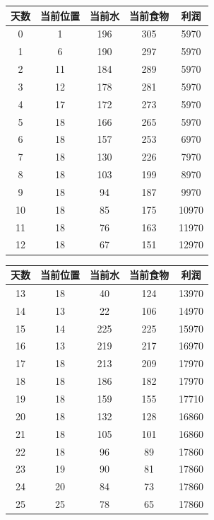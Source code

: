 \begin{figure}[h]
\centering
\begin{subfigure}[t]{0.48\textwidth}
\centering
\renewcommand{\arraystretch}{1.2}
\begin{tabular}{|c|c|c|c|c|}
\hline
天数 & 当前位置 & 当前水 & 当前食物 & 利润 \\
\hline
0 & 1 & 196 & 305 & 5970 \\
1 & 6 & 190 & 297 & 5970 \\
2 & 11 & 184 & 289 & 5970 \\
3 & 12 & 178 & 281 & 5970 \\
4 & 17 & 172 & 273 & 5970 \\
5 & 18 & 166 & 265 & 5970 \\
6 & 18 & 157 & 253 & 6970 \\
7 & 18 & 130 & 226 & 7970 \\
8 & 18 & 103 & 199 & 8970 \\
9 & 18 & 94 & 187 & 9970 \\
10 & 18 & 85 & 175 & 10970 \\
11 & 18 & 76 & 163 & 11970 \\
12 & 18 & 67 & 151 & 12970 \\
\hline
\end{tabular}
\end{subfigure}
\hfill
\begin{subfigure}[t]{0.48\textwidth}
\centering
\renewcommand{\arraystretch}{1.2}
\begin{tabular}{|c|c|c|c|c|}
\hline
天数 & 当前位置 & 当前水 & 当前食物 & 利润 \\
\hline
13 & 18 & 40 & 124 & 13970 \\
14 & 13 & 22 & 106 & 14970 \\
15 & 14 & 225 & 225 & 15970 \\
16 & 13 & 219 & 217 & 16970 \\
17 & 18 & 213 & 209 & 17970 \\
18 & 18 & 186 & 182 & 17970 \\
19 & 18 & 159 & 155 & 17710 \\
20 & 18 & 132 & 128 & 16860 \\
21 & 18 & 105 & 101 & 16860 \\
22 & 18 & 96 & 89 & 17860 \\
23 & 19 & 90 & 81 & 17860 \\
24 & 20 & 84 & 73 & 17860 \\
25 & 25 & 78 & 65 & 17860 \\
\hline
\end{tabular}
\end{subfigure}
\end{figure}

